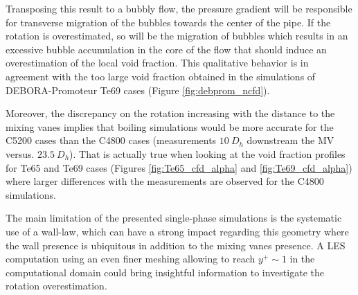 \npar

Transposing this result to a bubbly flow, the pressure gradient will be responsible for transverse migration of the bubbles towards the center of the pipe. If the rotation is overestimated, so will be the migration of bubbles which results in an excessive bubble accumulation in the core of the flow that should induce an overestimation of the local void fraction. This qualitative behavior is in agreement with the too large void fraction obtained in the simulations of DEBORA-Promoteur Te69 cases (Figure \ref{fig:debprom_ncfd}).

\npar

Moreover, the discrepancy on the rotation increasing with the distance to the mixing vanes implies that boiling simulations would be more accurate for the C5200 cases than the C4800 cases (measurements $10\ D_{h}$ downstream the MV versus. $23.5\ D_{h}$). That is actually true when looking at the void fraction profiles for Te65 and Te69 cases (Figures \ref{fig:Te65_cfd_alpha} and \ref{fig:Te69_cfd_alpha}) where larger differences with the measurements are observed for the C4800 simulations.



\begin{remark*}{}
The main limitation of the presented single-phase simulations is the systematic use of a wall-law, which can have a strong impact regarding this geometry where the wall presence is ubiquitous in addition to the mixing vanes presence. A LES computation using an even finer meshing allowing to reach $y^{+} \sim 1$ in the computational domain could bring insightful information to investigate the rotation overestimation.
\end{remark*}

